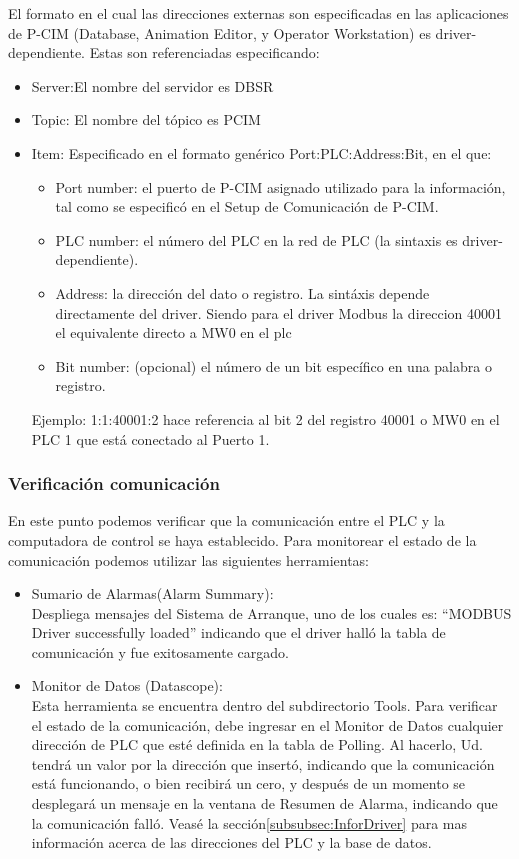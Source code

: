 El formato en el cual las direcciones externas son especificadas en las
aplicaciones de P-CIM (Database, Animation Editor, y Operator
Workstation) es driver-dependiente. Estas son referenciadas especificando:
\begin{itemize}
 \item Server:El nombre del servidor es DBSR
 \item Topic: El nombre del tópico es PCIM
 \item Item: Especificado en el formato genérico Port:PLC:Address:Bit, en
  el que:
  \begin{itemize}
   \item Port number: el puerto de P-CIM asignado utilizado para la 
información, 
    tal como se especificó en el Setup de Comunicación de P-CIM.
   \item PLC number: el número del PLC en la red de PLC (la sintaxis es driver-
    dependiente).
    \item Address: la dirección del dato o registro. La sintáxis depende 
    directamente del driver. Siendo para el driver Modbus la direccion 40001 el 
equivalente directo a MW0 en el \gls{plc}
    \item Bit number: (opcional) el número de un bit específico en una palabra 
    o registro.
  \end{itemize}
  Ejemplo: 1:1:40001:2 hace referencia al bit 2 del registro 40001 o MW0 en el 
  PLC 1 que está conectado al Puerto 1.
\end{itemize}

\subsubsection{Verificación comunicación}
En este punto podemos verificar que la comunicación entre el PLC y la
computadora de control se haya establecido. Para monitorear el estado 
de la comunicación podemos utilizar las siguientes herramientas:
\begin{itemize}
 \item Sumario de Alarmas(Alarm Summary):\\
  Despliega mensajes del Sistema de Arranque, uno de los cuales es: “MODBUS
  Driver successfully loaded” indicando que el driver halló la tabla de 
  comunicación y fue exitosamente cargado.
 \item Monitor de Datos (Datascope):\\
  Esta herramienta se encuentra dentro del subdirectorio Tools.
  Para verificar el estado de la comunicación,
  debe ingresar en el Monitor de Datos cualquier dirección de PLC que esté 
  definida en la tabla de Polling. Al hacerlo, Ud. tendrá un valor por la 
  dirección que insertó,
  indicando que la comunicación está funcionando, o bien recibirá un cero, y
  después de un momento se desplegará un mensaje en la ventana de Resumen
  de Alarma, indicando que la comunicación falló. Veasé la 
  sección\ref{subsubsec:InforDriver} para mas información acerca de las 
  direcciones del PLC y la base de datos.
\end{itemize}


